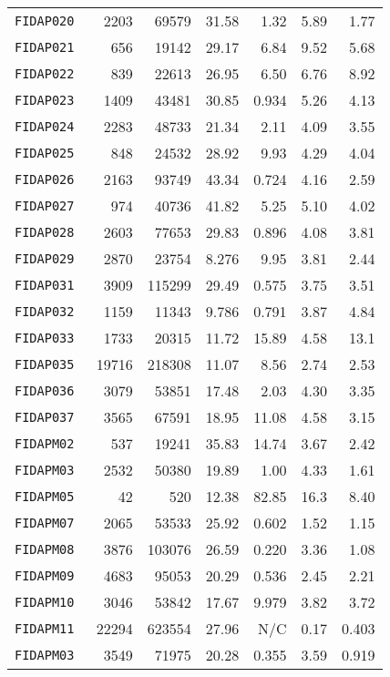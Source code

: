 \documentclass[acmtocl]{acmtrans2m}
\begin{document}
\begin{table}
\begin{center}
\begin{tabular}{|l r r r| r r r|}
\tt FIDAP020 & 2203  & 69579  & 31.58 & 1.32   & 5.89  & 1.77  \\  
\tt FIDAP021 & 656   & 19142  & 29.17 & 6.84   & 9.52  & 5.68  \\  
\tt FIDAP022 & 839   & 22613  & 26.95 & 6.50   & 6.76  & 8.92  \\
\tt FIDAP023 & 1409  & 43481  & 30.85 & 0.934  & 5.26  & 4.13  \\
\tt FIDAP024 & 2283  & 48733  & 21.34 & 2.11   & 4.09  & 3.55  \\
\tt FIDAP025 & 848   & 24532  & 28.92 & 9.93   & 4.29  & 4.04  \\
\tt FIDAP026 & 2163  & 93749  & 43.34 & 0.724  & 4.16  & 2.59  \\
\tt FIDAP027 & 974   & 40736  & 41.82 & 5.25   & 5.10  & 4.02  \\
\tt FIDAP028 & 2603  & 77653  & 29.83 & 0.896  & 4.08  & 3.81  \\
\tt FIDAP029 & 2870  & 23754  & 8.276 & 9.95   & 3.81  & 2.44  \\
\tt FIDAP031 & 3909  & 115299 & 29.49 & 0.575  & 3.75  & 3.51  \\
\tt FIDAP032 & 1159  & 11343  & 9.786 & 0.791  & 3.87  & 4.84  \\
\tt FIDAP033 & 1733  & 20315  & 11.72 & 15.89  & 4.58  & 13.1   \\
\tt FIDAP035 & 19716 & 218308 & 11.07 & 8.56   & 2.74  & 2.53  \\
\tt FIDAP036 & 3079  & 53851  & 17.48 & 2.03   & 4.30  & 3.35  \\
\tt FIDAP037 & 3565  & 67591  & 18.95 & 11.08  & 4.58  & 3.15  \\
\tt FIDAPM02 & 537   & 19241  & 35.83 & 14.74  & 3.67  & 2.42  \\
\tt FIDAPM03 & 2532  & 50380  & 19.89 & 1.00   & 4.33  & 1.61  \\
\tt FIDAPM05 & 42    & 520    & 12.38 & 82.85  & 16.3  & 8.40  \\
\tt FIDAPM07 & 2065  & 53533  & 25.92 & 0.602  & 1.52  & 1.15  \\
\tt FIDAPM08 & 3876  & 103076 & 26.59 & 0.220  & 3.36  & 1.08  \\
\tt FIDAPM09 & 4683  & 95053  & 20.29 & 0.536  & 2.45  & 2.21  \\
\tt FIDAPM10 & 3046  & 53842  & 17.67 & 9.979  & 3.82  & 3.72  \\
\tt FIDAPM11 & 22294 & 623554 & 27.96 & N/C    & 0.17  & 0.403 \\
\tt FIDAPM03 & 3549  & 71975  & 20.28 & 0.355  & 3.59  & 0.919 \\

\end{tabular}
\end{center}
\end{table}
\end{document}
